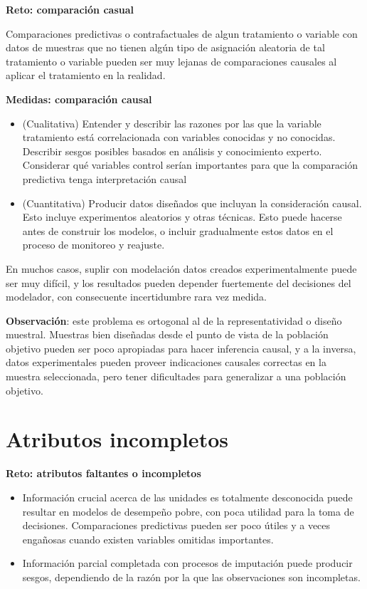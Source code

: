 \documentclass[
]{book}
\let\BeginKnitrBlock\begin \let\EndKnitrBlock\end
\begin{document}
\BeginKnitrBlock{rmdnote}
\textbf{Reto: comparación casual}

Comparaciones predictivas o contrafactuales de algun tratamiento o variable
con datos de muestras que no tienen algún tipo de asignación aleatoria de tal tratamiento o
variable pueden ser muy lejanas de comparaciones causales al aplicar el tratamiento
en la realidad.
\EndKnitrBlock{rmdnote}

\BeginKnitrBlock{rmdtip}
\textbf{Medidas: comparación causal}

\begin{itemize}
\item
  (Cualitativa) Entender y describir las razones por las que la variable tratamiento está
  correlacionada con variables conocidas y no conocidas.
  Describir sesgos posibles basados en análisis y conocimiento experto. Considerar qué variables
  control serían importantes para que la comparación predictiva tenga interpretación causal
\item
  (Cuantitativa) Producir datos diseñados que incluyan la consideración causal. Esto incluye
  experimentos aleatorios y otras técnicas. Esto puede hacerse antes de construir los modelos, o incluir
  gradualmente estos datos en el proceso de monitoreo y reajuste.
\end{itemize}
\EndKnitrBlock{rmdtip}

En muchos casos, suplir con modelación datos creados experimentalmente puede ser muy difícil, y los
resultados pueden depender fuertemente del decisiones del modelador, con consecuente incertidumbre rara vez medida.

\textbf{Observación}: este problema es ortogonal al de la representatividad o diseño
muestral. Muestras bien diseñadas desde el punto de vista de la población objetivo pueden
ser poco apropiadas para hacer inferencia causal, y a la inversa, datos experimentales pueden proveer indicaciones
causales correctas en la muestra seleccionada, pero tener dificultades para generalizar a una población objetivo.

\hypertarget{atributos-incompletos}{%
\section{Atributos incompletos}\label{atributos-incompletos}}

\BeginKnitrBlock{rmdnote}
\textbf{Reto: atributos faltantes o incompletos}

\begin{itemize}
\item
  Información crucial acerca de las unidades es totalmente desconocida puede resultar en
  modelos de desempeño pobre, con poca utilidad para la toma de decisiones. Comparaciones predictivas pueden ser
  poco útiles y a veces engañosas cuando existen variables omitidas importantes.
\item
  Información parcial
  completada con procesos de imputación puede producir sesgos, dependiendo de la
  razón por la que las observaciones son incompletas.
\end{itemize}
\EndKnitrBlock{rmdnote}
\end{document}
